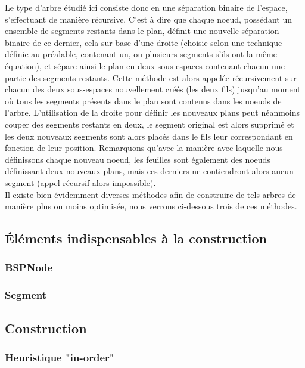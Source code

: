 \documentclass[11pt,a4paper]{article}
\begin{document}
Le type d'arbre étudié ici consiste donc en une séparation binaire de l'espace, s'effectuant de manière récursive. C'est à dire que chaque noeud, possédant un ensemble de segments restants dans le plan, définit une nouvelle séparation binaire de ce dernier, cela sur base d'une droite (choisie selon une technique définie au préalable, contenant un, ou plusieurs segments s'ils ont la même équation), et sépare ainsi le plan en deux sous-espaces contenant chacun une partie des segments restants. Cette méthode est alors appelée récursivement sur chacun des deux sous-espaces nouvellement créés (les deux fils) jusqu'au moment où tous les segments présents dans le plan sont contenus dans les noeuds de l'arbre. L'utilisation de la droite pour définir les nouveaux plans peut néanmoins couper des segments restants en deux, le segment original est alors supprimé et les deux nouveaux segments sont alors placés dans le fils leur correspondant en fonction de leur position. Remarquons qu'avec la manière avec laquelle nous définissons chaque nouveau noeud, les feuilles sont également des noeuds définissant deux nouveaux plans, mais ces derniers ne contiendront alors aucun segment (appel récursif alors impossible). \\

Il existe bien évidemment diverses méthodes afin de construire de tels arbres de manière plus ou moins optimisée, nous verrons ci-dessous trois de ces méthodes. 

\subsection{Éléments indispensables à la construction}
\subsubsection{BSPNode} 
\subsubsection{Segment}

\subsection{Construction}
\subsubsection{Heuristique "in-order"}
\end{document}
